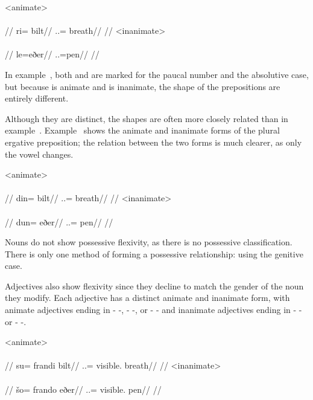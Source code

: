 	\a<animate>\begingl
		\glpreamble{}\\
		\\
		//
		\gla ri= bilt//
		\glb \An.\Pc.\Abs= breath//
		\glft{}//
	\endgl
	\a<inanimate>\begingl
		\glpreamble{}\\
		\\
		//
		\gla le=eðer//
		\glb \In.\Pc.\Abs=pen//
		\glft{}//
	\endgl
\xe

In example~, both   and   are marked for the paucal number and the absolutive case, but because   is animate and   is inanimate, the shape of the prepositions are entirely different.

Although they are distinct, the shapes are often more closely related than in example~. Example~ shows the animate and inanimate forms of the plural ergative preposition; the relation between the two forms is much clearer, as only the vowel changes.

	\a<animate>\begingl
		\glpreamble{}\\
		\\
		//
		\gla din= bilt//
		\glb \An.\Pl.\Erg= breath//
		\glft{}//
	\endgl
	\a<inanimate>\begingl
		\glpreamble{}\\
		\\
		//
		\gla dun= eðer//
		\glb \In.\Pl.\Erg= pen//
		\glft{}//
	\endgl
\xe

Nouns do not show possessive flexivity, as there is no possessive classification\autocite{wals-59}. There is only one method of forming a possessive relationship: using the genitive case.

Adjectives also show flexivity since they decline to match the gender of the noun they modify. Each adjective has a distinct animate and inanimate form, with animate adjectives ending in - -, - -, or - - and inanimate adjectives ending in - - or - -.

	\a<animate>\begingl
		\glpreamble{}\\
		\\
		//
		\gla su= frandi bilt//
		\glb \An.\Sg.\Gen= visible.\An{} breath//
		\glft{}//
	\endgl
	\a<inanimate>\begingl
		\glpreamble{}\\
		\\
		//
		\gla šo= frando eðer//
		\glb \In.\Sg.\Gen= visible.\In{} pen//
		\glft{}//
	\endgl
\xe

